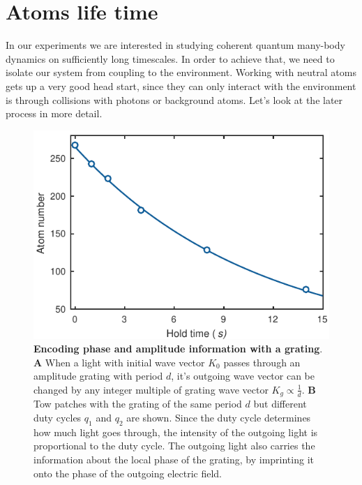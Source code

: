 \section{Atoms life time}
In our experiments we are interested in studying coherent quantum many-body dynamics on sufficiently long timescales. In order to achieve that, we need to isolate our system from coupling to the environment. Working with neutral atoms gets up a very good head start, since they can only interact with the environment is through collisions with photons or background atoms. Let's look at the later process in more detail.

\begin{figure}[t]
	\centering
	\includegraphics[scale=1]{figures/CTE_lifetime.pdf}
	\caption{{\bf Encoding phase and amplitude information with a grating}. {\bf A} When a light with initial wave vector $K_0$ passes through an amplitude grating with period $d$, it's outgoing wave vector can be changed by any integer multiple of grating wave vector $K_g\propto \frac{1}{d}$. {\bf B} Tow patches with the grating of the same period $d$ but different duty cycles $q_1$ and $q_2$ are shown. Since the duty cycle determines how much light goes through, the intensity of the outgoing light is proportional to the duty cycle. The outgoing light also carries the information about the local phase of the grating, by imprinting it onto the phase of the outgoing electric field.}
	\label{fig:CTE_liefetime}
\end{figure}


